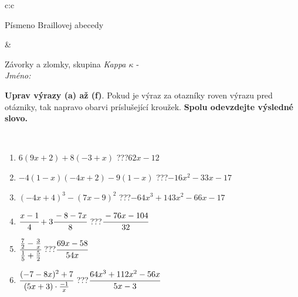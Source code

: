 \documentclass[10pt]{report}
\begin{document}
\begin{tabular}{c:c}
\begin{minipage}[c][104.5mm][t]{0.5\linewidth}
\begin{center}
\begin{minipage}{0.20\linewidth}
\begin{center}
{\small Písmeno Braillovej abecedy}
\end{center}
\end{minipage}
\end{center}
\end{minipage}
&
\begin{minipage}[c][104.5mm][t]{0.5\linewidth}
\begin{center}
\vspace{7mm}
{\huge Závorky a zlomky, skupina \textit{Kappa $\kappa$} -}\\[5mm]
\textit{Jméno:}\phantom{xxxxxxxxxxxxxxxxxxxxxxxxxxxxxxxxxxxxxxxxxxxxxxxxxxxxxxxxxxxxxxxxx}\\[5mm]
\begin{minipage}{0.95\linewidth}
\begin{center}
\textbf{Uprav výrazy (a) až (f)}. Pokud je výraz za otazníky roven výrazu pred otázniky, tak napravo obarvi príslušející kroužek. \textbf{Spolu odevzdejte výsledné slovo.}
\end{center}
\end{minipage}
\\[1mm]
\begin{minipage}{0.79\linewidth}
\begin{center}
\begin{varwidth}{\linewidth}
\begin{enumerate}
\normalsize
\item $6(9x+2)+8(-3+x)$\quad \dotfill\; ???\;\dotfill \quad $62x-12$
\item $-4(1-x)(-4x+2)-9(1-x)$\quad \dotfill\; ???\;\dotfill \quad $-16x^2-33x-17$
\item $(-4x+4)^3-(7x-9)^2$\quad \dotfill\; ???\;\dotfill \quad $-64x^3+143x^2-66x-17$
\item $\cfrac{x-1}{4}+3\cfrac{-8-7x}{8}$\quad \dotfill\; ???\;\dotfill \quad $\cfrac{-76x-104}{32}$
\item $\cfrac{\frac{7}{2}-\frac{3}{x}}{\frac{1}{5}+\frac{5}{2}}$\quad \dotfill\; ???\;\dotfill \quad $\cfrac{69x-58}{54x}$
\item $\cfrac{(-7-8x)^2+7}{(5x+3)\cdot\frac{-1}{x}}$\quad \dotfill\; ???\;\dotfill \quad $\cfrac{64x^3+112x^2-56x}{5x-3}$
\end{enumerate}
\end{varwidth}
\end{center}
\end{minipage}
\begin{minipage}{0.20\linewidth}
\begin{center}

\end{center}
\end{minipage}
\end{center}
\end{minipage}
\end{tabular}
\end{document}
